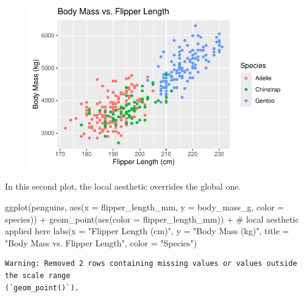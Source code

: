 \documentclass[
  letterpaper,
  DIV=11,
  numbers=noendperiod]{scrreprt}
\newenvironment{Shaded}{\begin{snugshade}}{\end{snugshade}}
\newcommand{\AttributeTok}[1]{\textcolor[rgb]{0.40,0.45,0.13}{#1}}
\newcommand{\CommentTok}[1]{\textcolor[rgb]{0.37,0.37,0.37}{#1}}
\newcommand{\FunctionTok}[1]{\textcolor[rgb]{0.28,0.35,0.67}{#1}}
\newcommand{\NormalTok}[1]{\textcolor[rgb]{0.00,0.23,0.31}{#1}}
\newcommand{\SpecialCharTok}[1]{\textcolor[rgb]{0.37,0.37,0.37}{#1}}
\newcommand{\StringTok}[1]{\textcolor[rgb]{0.13,0.47,0.30}{#1}}
\begin{document}
\begin{figure}[H]

{\centering \includegraphics{scripts/02_dataViz/class4_files/figure-pdf/local_aesthetics-1.pdf}

}

\end{figure}

In this second plot, the local aesthetic overrides the global one.

\begin{Shaded}
\begin{Highlighting}[]
\FunctionTok{ggplot}\NormalTok{(penguins, }\FunctionTok{aes}\NormalTok{(}\AttributeTok{x =}\NormalTok{ flipper\_length\_mm, }\AttributeTok{y =}\NormalTok{ body\_mass\_g, }\AttributeTok{color =}\NormalTok{ species)) }\SpecialCharTok{+}
  \FunctionTok{geom\_point}\NormalTok{(}\FunctionTok{aes}\NormalTok{(}\AttributeTok{color =}\NormalTok{ flipper\_length\_mm)) }\SpecialCharTok{+} \CommentTok{\# local aesthetic applied here}
  \FunctionTok{labs}\NormalTok{(}\AttributeTok{x =} \StringTok{"Flipper Length (cm)"}\NormalTok{, }\AttributeTok{y =} \StringTok{"Body Mass (kg)"}\NormalTok{,}
       \AttributeTok{title =} \StringTok{"Body Mass vs. Flipper Length"}\NormalTok{,}
       \AttributeTok{color =} \StringTok{"Species"}\NormalTok{)}
\end{Highlighting}
\end{Shaded}

\begin{verbatim}
Warning: Removed 2 rows containing missing values or values outside the scale range
(`geom_point()`).
\end{verbatim}
\end{document}

